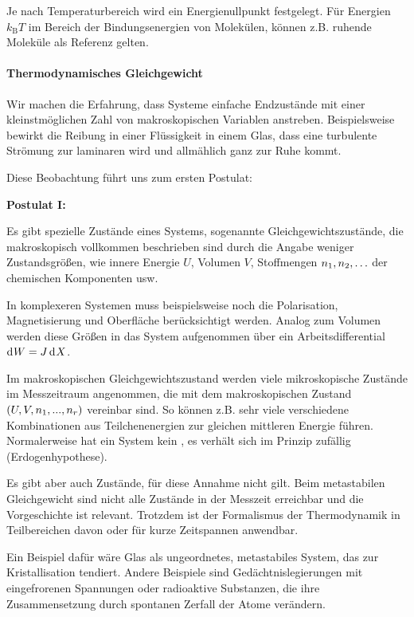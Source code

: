 Je nach Temperaturbereich wird ein Energienullpunkt festgelegt.
Für Energien $k_\mathrm{B}T$ im Bereich der Bindungsenergien von Molekülen, können z.B. ruhende Moleküle als Referenz gelten.


\paragraph*{Thermodynamisches Gleichgewicht}

Wir machen die Erfahrung, dass Systeme einfache Endzustände mit einer kleinstmöglichen Zahl von makroskopischen Variablen anstreben. Beispielsweise bewirkt die Reibung in einer Flüssigkeit in einem Glas, dass eine turbulente Strömung zur laminaren wird und allmählich ganz zur Ruhe kommt.

Diese Beobachtung führt uns zum ersten Postulat:
\begin{postulate}
    \textbf{Postulat I:}

    Es gibt spezielle Zustände eines Systems, sogenannte Gleichgewichtszustände, die makroskopisch vollkommen beschrieben sind durch die Angabe weniger Zustandsgrößen, wie innere Energie $U$, Volumen $V$, Stoffmengen $n_1,n_2,\ldots$ der chemischen Komponenten usw.
\end{postulate}


In komplexeren Systemen muss beispielsweise noch die Polarisation, Magnetisierung und Oberfläche berücksichtigt werden. Analog zum Volumen werden diese Größen in das System aufgenommen über ein Arbeitsdifferential $\mathop{\mathrm{d}^{}W} = J\mathop{\mathrm{d}^{}X}$.

Im makroskopischen Gleichgewichtszustand werden viele mikroskopische Zustände im Messzeitraum angenommen, die mit dem makroskopischen Zustand $(U,V,n_1,...,n_r)$ vereinbar sind. So können z.B. sehr viele verschiedene Kombinationen aus Teilchenenergien zur gleichen mittleren Energie führen. Normalerweise hat ein System kein , es verhält sich im Prinzip zufällig (Erdogenhypothese).

Es gibt aber auch Zustände, für diese Annahme nicht gilt. Beim metastabilen Gleichgewicht sind nicht alle Zustände in der Messzeit erreichbar und die Vorgeschichte ist relevant. Trotzdem ist der Formalismus der Thermodynamik in Teilbereichen davon oder für kurze Zeitspannen anwendbar.


Ein Beispiel dafür %
wäre Glas als ungeordnetes, metastabiles System, das zur Kristallisation tendiert. Andere Beispiele sind Gedächtnislegierungen mit eingefrorenen Spannungen oder radioaktive Substanzen, die ihre Zusammensetzung durch spontanen Zerfall der Atome verändern.


